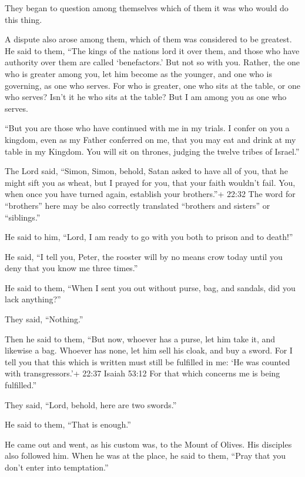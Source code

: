  They began to question among themselves which of them it
was who would do this thing.

 A dispute also arose among them, which of them was
considered to be greatest.  He said to them, ``The kings of
the nations lord it over them, and those who have authority over them
are called `benefactors.'  But not so with you. Rather, the
one who is greater among you, let him become as the younger, and one who
is governing, as one who serves.  For who is greater, one
who sits at the table, or one who serves? Isn't it he who sits at the
table? But I am among you as one who serves.

 ``But you are those who have continued with me in my
trials.  I confer on you a kingdom, even as my Father
conferred on me,  that you may eat and drink at my table in
my Kingdom. You will sit on thrones, judging the twelve tribes of
Israel.''

 The Lord said, ``Simon, Simon, behold, Satan asked to have
all of you, that he might sift you as wheat,  but I prayed
for you, that your faith wouldn't fail. You, when once you have turned
again, establish your brothers.''+ 22:32 The word for ``brothers'' here
may be also correctly translated ``brothers and sisters'' or
``siblings.''

 He said to him, ``Lord, I am ready to go with you both to
prison and to death!''

 He said, ``I tell you, Peter, the rooster will by no means
crow today until you deny that you know me three times.''

 He said to them, ``When I sent you out without purse, bag,
and sandals, did you lack anything?''

They said, ``Nothing.''

 Then he said to them, ``But now, whoever has a purse, let
him take it, and likewise a bag. Whoever has none, let him sell his
cloak, and buy a sword.  For I tell you that this which is
written must still be fulfilled in me: `He was counted with
transgressors.'+ 22:37 Isaiah 53:12 For that which concerns me is being
fulfilled.''

 They said, ``Lord, behold, here are two swords.''

He said to them, ``That is enough.''

 He came out and went, as his custom was, to the Mount of
Olives. His disciples also followed him.  When he was at
the place, he said to them, ``Pray that you don't enter into
temptation.''

